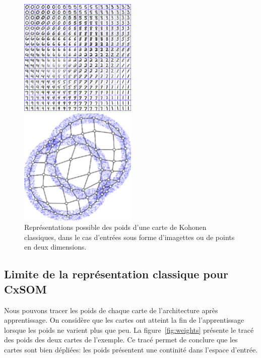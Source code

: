\begin{figure}
\begin{minipage}{0.5\textwidth}
\centering
\includegraphics[width=0.5\textwidth]{digits.jpg}
\end{minipage}
\begin{minipage}{0.5\textwidth}
\centering
\includegraphics[width=0.5\textwidth]{points.png}
\end{minipage}
\label{fig:representation}
\caption{Représentations possible des poids d'une carte de Kohonen classiques, dans le cas d'entrées sous forme d'imagettes ou de points en deux dimensions.}
\end{figure}

\subsection{Limite de la représentation classique pour CxSOM}

Nous pouvons tracer les poids de chaque carte de l'architecture après apprentissage. On considère que les cartes ont atteint la fin de l'apprentissage lorsque les poids ne varient plus que peu.
La figure~\ref{fig:weights} présente le tracé des poids des deux cartes de l'exemple. Ce tracé permet de conclure que les cartes sont bien dépliées: les poids présentent une continité dans l'espace d'entrée.

